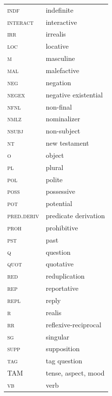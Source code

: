 \documentclass[output=paper,colorlinks,citecolor=brown]{langscibook}
\begin{document}
\begin{tabularx}{.5\textwidth}{lQ}%
\scshape indf & indefinite \\
\scshape interact & interactive \\
\scshape irr & irrealis \\
\scshape loc & locative \\
\scshape m & masculine \\
\scshape mal & malefactive \\
\scshape neg & negation \\
\scshape negex & negative existential \\
\scshape nfnl & non-final \\
\scshape nmlz & nominalizer \\
\scshape nsubj & non-subject \\
\scshape nt & new testament\\
\scshape o & object\\
\scshape pl & plural\\
\scshape pol & polite \\
\scshape poss & possessive \\
\scshape pot & potential \\
\scshape pred.deriv & predicate derivation \\
\scshape proh & prohibitive \\
\scshape pst & past \\
\scshape q & question \\
\scshape quot & quotative \\
\scshape red & reduplication \\
\scshape rep & reportative \\
\scshape repl & reply \\
\scshape r & realis \\
\scshape rr & reflexive-reciprocal \\
\scshape sg & singular \\
\scshape supp & supposition \\
\scshape tag & tag question \\
\scshape TAM & tense, aspect, mood \\
\scshape vb & verb \\
\end{tabularx}

\sloppy\printbibliography[heading=subbibliography,notkeyword=this]
\end{document}
